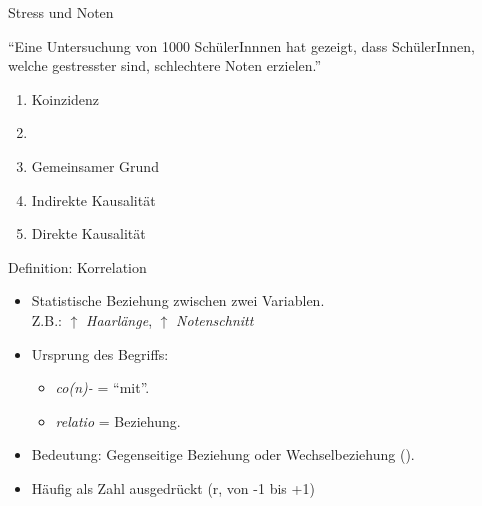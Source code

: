 \begin{frame}{Stress und Noten}
    \begin{center}
        \enquote{Eine Untersuchung von 1000 SchülerInnnen hat gezeigt, dass SchülerInnen, welche gestresster sind, schlechtere Noten erzielen.}
    \end{center}
    \begin{enumerate}
        \item Koinzidenz
        \item {}
        \item Gemeinsamer Grund
        \item Indirekte Kausalität
        \item Direkte Kausalität
    \end{enumerate}
\end{frame}

\begin{frame}{Definition: Korrelation}
    \begin{mydefinition}[Korrelation]
    \begin{itemize}[<+->]
        \item Statistische Beziehung zwischen zwei Variablen.\\
              Z.B.: $\uparrow$ \textit{Haarlänge}, $\uparrow$ \textit{Notenschnitt}
        \item Ursprung des Begriffs:
              \begin{itemize}
                  \item \textit{co(n)-} = \enquote{mit}.
                  \item \textit{relatio} = Beziehung.
              \end{itemize}
        \item Bedeutung: Gegenseitige Beziehung oder Wechselbeziehung ().
        \item Häufig als Zahl ausgedrückt (r, von -1 bis +1)
    \end{itemize}
    \end{mydefinition}
\end{frame}

